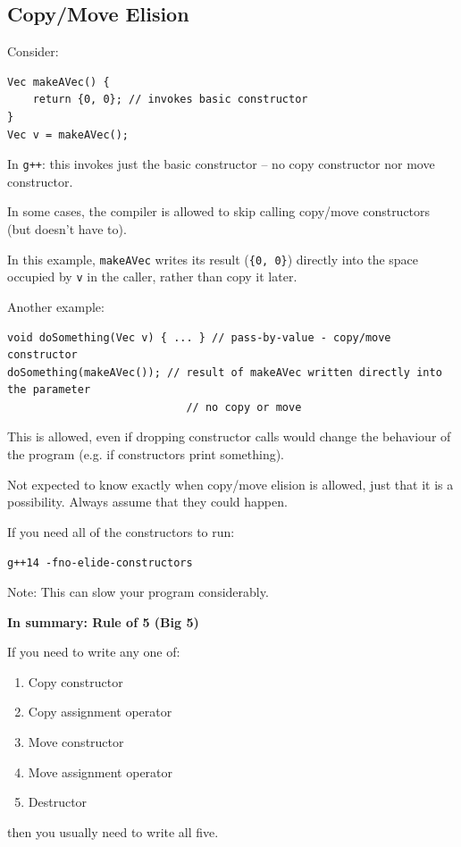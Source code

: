\documentclass[11pt]{article}
\theoremstyle{definition}
\begin{document}
\subsection{Copy/Move Elision}
Consider:
\begin{lstlisting}
Vec makeAVec() {
    return {0, 0}; // invokes basic constructor
}
Vec v = makeAVec();
\end{lstlisting}
In {\tt g++}: this invokes just the basic constructor -- no copy constructor nor move constructor.

In some cases, the compiler is allowed to skip calling copy/move constructors (but doesn't have to). 

In this example, {\tt makeAVec} writes its result ({\tt \{0, 0\}}) directly into the space occupied by {\tt v} in the caller, rather than copy it later.

Another example:
\begin{lstlisting}
void doSomething(Vec v) { ... } // pass-by-value - copy/move constructor
doSomething(makeAVec()); // result of makeAVec written directly into the parameter
                            // no copy or move
\end{lstlisting}
This is allowed, even if dropping constructor calls would change the behaviour of the program (e.g. if constructors print something). 

Not expected to know exactly when copy/move elision is allowed, just that it is a possibility. Always assume that they could happen.

If you need all of the constructors to run:

{\tt g++14 -fno-elide-constructors}

Note: This can slow your program considerably.

\vspace{0.1cm}
{\bf In summary: Rule of 5 (Big 5)}

If you need to write any one of: \vspace{-0.25cm}
\begin{enumerate}[(1)]
\item Copy constructor
\item Copy assignment operator
\item Move constructor
\item Move assignment operator
\item Destructor
\end{enumerate}
\vspace{-0.25cm}
then you usually need to write all five.
\end{document}
